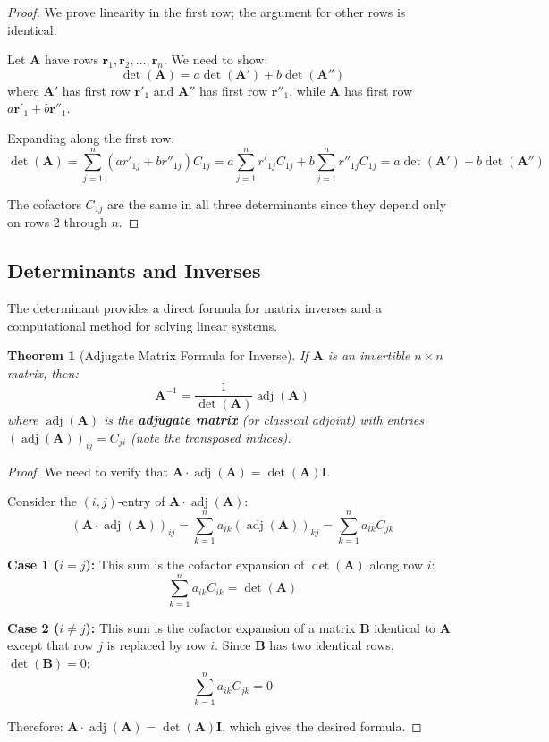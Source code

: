 \documentclass[12pt]{article}
\numberwithin{equation}{section}
\newcommand{\vect}[1]{\boldsymbol{#1}}   %
\newcommand{\mat}[1]{\mathbf{#1}}        %
\newcommand{\adj}{\operatorname{adj}}
\theoremstyle{plain}
\newtheorem{theorem}{Theorem}[section]
\theoremstyle{definition}
\theoremstyle{remark}
\begin{document}
\begin{proof}
We prove linearity in the first row; the argument for other rows is identical.

Let $\mat{A}$ have rows $\vect{r}_1, \vect{r}_2, \ldots, \vect{r}_n$. We need to show:
$$\det(\mat{A}) = a\det(\mat{A}') + b\det(\mat{A}'')$$
where $\mat{A}'$ has first row $\vect{r}'_1$ and $\mat{A}''$ has first row $\vect{r}''_1$, while $\mat{A}$ has first row $a\vect{r}'_1 + b\vect{r}''_1$.

Expanding along the first row:
$$\det(\mat{A}) = \sum_{j=1}^n (a r'_{1j} + b r''_{1j})C_{1j} = a\sum_{j=1}^n r'_{1j}C_{1j} + b\sum_{j=1}^n r''_{1j}C_{1j} = a\det(\mat{A}') + b\det(\mat{A}'')$$

The cofactors $C_{1j}$ are the same in all three determinants since they depend only on rows 2 through $n$.
\end{proof}

\subsection{Determinants and Inverses}

The determinant provides a direct formula for matrix inverses and a computational method for solving linear systems.

\begin{theorem}[Adjugate Matrix Formula for Inverse]
If $\mat{A}$ is an invertible $n \times n$ matrix, then:
$$\mat{A}^{-1} = \frac{1}{\det(\mat{A})}\adj(\mat{A})$$
where $\adj(\mat{A})$ is the \textbf{adjugate matrix} (or classical adjoint) with entries $(\adj(\mat{A}))_{ij} = C_{ji}$ (note the transposed indices).
\end{theorem}

\begin{proof}
We need to verify that $\mat{A} \cdot \adj(\mat{A}) = \det(\mat{A})\mat{I}$.

Consider the $(i,j)$-entry of $\mat{A} \cdot \adj(\mat{A})$:
$$(\mat{A} \cdot \adj(\mat{A}))_{ij} = \sum_{k=1}^n a_{ik}(\adj(\mat{A}))_{kj} = \sum_{k=1}^n a_{ik}C_{jk}$$

\textbf{Case 1 ($i = j$):} This sum is the cofactor expansion of $\det(\mat{A})$ along row $i$:
$$\sum_{k=1}^n a_{ik}C_{ik} = \det(\mat{A})$$

\textbf{Case 2 ($i \neq j$):} This sum is the cofactor expansion of a matrix $\mat{B}$ identical to $\mat{A}$ except that row $j$ is replaced by row $i$. Since $\mat{B}$ has two identical rows, $\det(\mat{B}) = 0$:
$$\sum_{k=1}^n a_{ik}C_{jk} = 0$$

Therefore: $\mat{A} \cdot \adj(\mat{A}) = \det(\mat{A})\mat{I}$, which gives the desired formula.
\end{proof}
\end{document}
